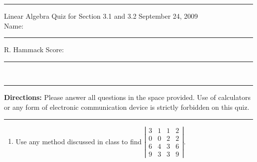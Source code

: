 \documentclass[10pt]{article}
\begin{document}
\hrule
Linear Algebra \hfill Quiz for Section 3.1 and 3.2 \hfill September 24, 2009\\


Name: \rule{1.75in}{0.005in}  \hspace{0.7in} R. Hammack \hfill Score: \rule{0.5in}{0.005in}  \\
\hrule
{\bf Directions:} 
Please answer all questions in the space provided. Use of calculators or any form
of electronic communication device is strictly forbidden on this quiz.
\vspace{0.25in}
\hrule
\begin{enumerate}
\item Use any method discussed in class to find
$\left|\begin{array}{rrrr}
3&1& 1 &2\\
0&0& 2 &2\\
6 & 4 & 3 & 6\\
9&3& 3 &9\end{array}\right|$.



\vfill

\end{enumerate}


 
\end{document}
